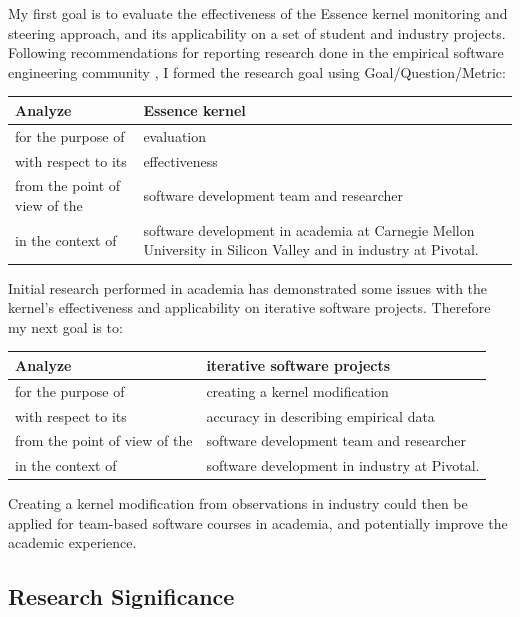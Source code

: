 \documentclass[preprint,12pt,3p]{elsarticle}
\begin{document}
My first goal is to evaluate the effectiveness of the Essence kernel monitoring and steering approach, and its applicability on a set of student and industry projects. Following recommendations for reporting research done in the empirical
software engineering community
\cite{GQM, Shaw}, I formed the
research goal using Goal/Question/Metric:
\cite{GQM}

\begin{table}[H]
\centering
\begin{tabular}{|p{2.00in}|p{4.10in}|}
\hline
Analyze & Essence kernel  \\ \hline
for the purpose of & evaluation \\ \hline
with respect to its & effectiveness \\ \hline
from the point of view of the & software development team and researcher \\ \hline
in the context of & software development in academia at Carnegie Mellon University in Silicon Valley and in industry at Pivotal. \\
\hline
\end{tabular}
\end{table}

Initial research performed in academia has demonstrated some issues with the kernel's effectiveness and applicability on iterative software projects. Therefore my next goal is to:

\begin{table}[H]
\centering
\begin{tabular}{|p{2.00in}|p{4.10in}|}
\hline
Analyze & iterative software projects  \\ \hline
for the purpose of & creating a kernel modification  \\ \hline
with respect to its & accuracy in describing empirical data \\ \hline
from the point of view of the & software development team and researcher \\ \hline
in the context of & software development in industry at Pivotal. \\
\hline
\end{tabular}
\end{table}

Creating a kernel modification from observations in industry could then be applied for team-based software courses in academia, and potentially improve the academic experience.

\subsection{Research Significance}
\end{document}
